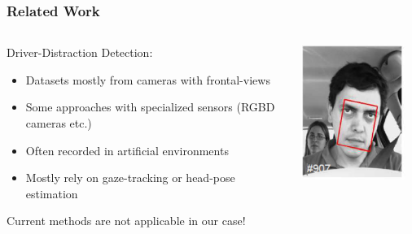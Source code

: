 \documentclass{beamer}
\begin{document}
	\begin{frame}
		\frametitle{Related Work}
		
		\begin{columns}
			\begin{column}{0.75\textwidth}
				Driver-Distraction Detection:
				\begin{itemize}
					\item Datasets mostly from cameras with frontal-views \cite{itsc:bergasa2008}
					\item Some approaches with specialized sensors (RGBD cameras etc.) \cite{Ragab2014}
					\item Often recorded in artificial environments
					\item Mostly rely on gaze-tracking or head-pose estimation
				\end{itemize}		
				Current methods are not applicable in our case!
			\end{column}
			\begin{column}{0.25\textwidth}  %
				\begin{center}
					\includegraphics[width=0.9\textwidth]{frontal-view-dataset} \\

\end{center}
\end{column}
\end{columns}
\end{frame}
\end{document}
